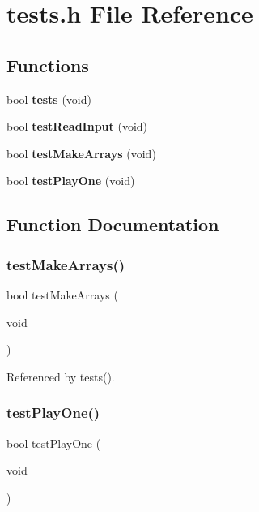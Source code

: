 \section{tests.\+h File Reference}
\label{tests_8h}
\subsection*{Functions}
\begin{DoxyCompactItemize}
\item 
bool \textbf{ tests} (void)
\item 
bool \textbf{ test\+Read\+Input} (void)
\item 
bool \textbf{ test\+Make\+Arrays} (void)
\item 
bool \textbf{ test\+Play\+One} (void)
\end{DoxyCompactItemize}


\subsection{Function Documentation}
\mbox{\label{tests_8h_af6e338851f3ccb4714e1bfb06ec4b428}} 
\subsubsection{test\+Make\+Arrays()}
{\footnotesize\ttfamily bool test\+Make\+Arrays (\begin{DoxyParamCaption}\item[{void}]{ }\end{DoxyParamCaption})}



Referenced by tests().

\mbox{\label{tests_8h_aa4c8095a20d90a18d843ab63ecd02d00}} 
\subsubsection{test\+Play\+One()}
{\footnotesize\ttfamily bool test\+Play\+One (\begin{DoxyParamCaption}\item[{void}]{ }\end{DoxyParamCaption})}



